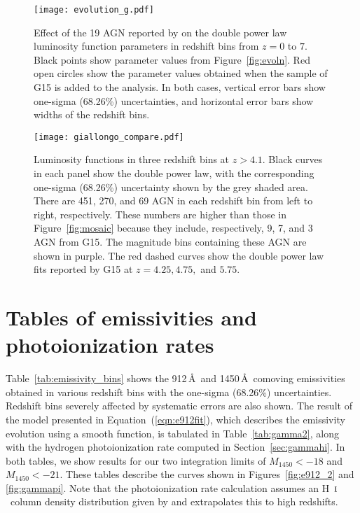 \documentclass[fleqn,usenatbib]{mnras}
\def\HI{\hbox{H~$\scriptstyle\rm I$}}
\begin{document}
\begin{figure*}
  \begin{center}
    \texttt{[image: evolution\_g.pdf]}
  \end{center}
  \caption{Effect of the 19 AGN reported by \citet{2015AA...578A..83G}
    on the double power law luminosity function parameters in
    redshift bins from $z=0$ to $7$.  Black points show parameter
    values from Figure~\ref{fig:evoln}.  Red open circles show the
    parameter values obtained when the sample of G15 is added to the
    analysis.  In both cases, vertical error bars show one-sigma
    (68.26\%) uncertainties, and horizontal error bars show widths of
    the redshift bins. \label{fig:params_giallongo}}
\end{figure*}

\begin{figure*}
  \begin{center}
    \texttt{[image: giallongo\_compare.pdf]}
  \end{center}
  \caption{Luminosity functions in three redshift bins at $z>4.1$.
    Black curves in each panel show the double power law,
    with the corresponding one-sigma (68.26\%) uncertainty shown by
    the grey shaded area.  There are 451, 270, and 69 AGN in each
    redshift bin from left to right, respectively.  These numbers are
    higher than those in Figure~\ref{fig:mosaic} because they include,
    respectively, 9, 7, and 3 AGN from G15.  The magnitude bins
    containing these AGN are shown in purple.  The red dashed curves
    show the double power law fits reported by G15 at $z=4.25, 4.75,$
    and $5.75$. \label{fig:lf_giallongo}}
\end{figure*}

\section{Tables of emissivities and photoionization rates}
\label{sec:tables}

Table~\ref{tab:emissivity_bins} shows the 912\,\AA\ and
1450\,\AA\ comoving emissivities obtained in various redshift bins
with the one-sigma (68.26\%) uncertainties.  Redshift bins severely
affected by systematic errors are also shown.  The result of the model
presented in Equation~(\ref{eqn:e912fit}), which describes the
emissivity evolution using a smooth function, is tabulated in
Table~\ref{tab:gamma2}, along with the hydrogen photoionization rate
computed in Section~\ref{sec:gammahi}.  In both tables, we show
results for our two integration limits of $M_{1450}<-18$ and
$M_{1450}<-21$.  These tables describe the curves shown in
Figures~\ref{fig:e912_2} and \ref{fig:gammapi}.  Note that the
photoionization rate calculation assumes an \HI\ column density
distribution given by \citet{2012ApJ...746..125H} and extrapolates
this to high redshifts.
\end{document}
